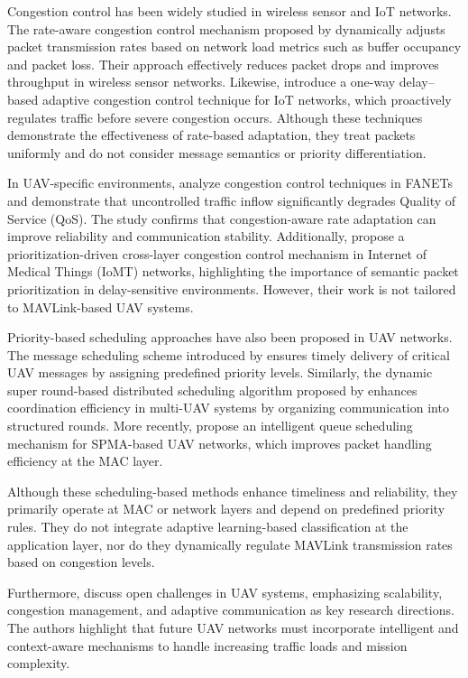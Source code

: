 \documentclass[pdflatex,sn-mathphys-num]{sn-jnl}%
\theoremstyle{thmstyleone}%
\theoremstyle{thmstyletwo}%
\theoremstyle{thmstylethree}%
\begin{document}
Congestion control has been widely studied in wireless sensor and IoT networks. The rate-aware congestion control mechanism proposed by \citet{grover2022rate} dynamically adjusts packet transmission rates based on network load metrics such as buffer occupancy and packet loss. Their approach effectively reduces packet drops and improves throughput in wireless sensor networks. Likewise, \citet{verma2024adaptive} introduce a one-way delay–based adaptive congestion control technique for IoT networks, which proactively regulates traffic before severe congestion occurs. Although these techniques demonstrate the effectiveness of rate-based adaptation, they treat packets uniformly and do not consider message semantics or priority differentiation.

In UAV-specific environments, \citet{anwekar2023analysis} analyze congestion control techniques in FANETs and demonstrate that uncontrolled traffic inflow significantly degrades Quality of Service (QoS). The study confirms that congestion-aware rate adaptation can improve reliability and communication stability. Additionally, \citet{buenrostro2023prioritization} propose a prioritization-driven cross-layer congestion control mechanism in Internet of Medical Things (IoMT) networks, highlighting the importance of semantic packet prioritization in delay-sensitive environments. However, their work is not tailored to MAVLink-based UAV systems.

Priority-based scheduling approaches have also been proposed in UAV networks. The message scheduling scheme introduced by \citet{li2018prioritizing} ensures timely delivery of critical UAV messages by assigning predefined priority levels. Similarly, the dynamic super round-based distributed scheduling algorithm proposed by \citet{halder2022dynamic} enhances coordination efficiency in multi-UAV systems by organizing communication into structured rounds. More recently, \citet{yang2025intelligent} propose an intelligent queue scheduling mechanism for SPMA-based UAV networks, which improves packet handling efficiency at the MAC layer.

Although these scheduling-based methods enhance timeliness and reliability, they primarily operate at MAC or network layers and depend on predefined priority rules. They do not integrate adaptive learning-based classification at the application layer, nor do they dynamically regulate MAVLink transmission rates based on congestion levels.

Furthermore, \citet{mohsan2023unmanned} discuss open challenges in UAV systems, emphasizing scalability, congestion management, and adaptive communication as key research directions. The authors highlight that future UAV networks must incorporate intelligent and context-aware mechanisms to handle increasing traffic loads and mission complexity.
\end{document}
